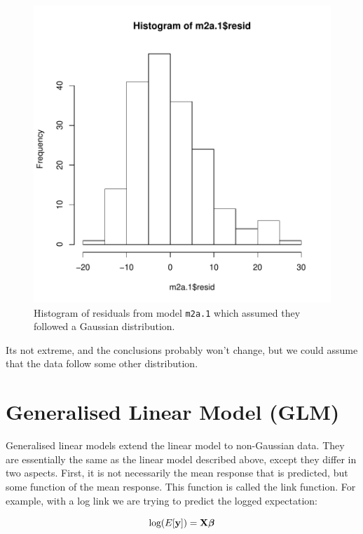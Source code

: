 \documentclass{article}
\begin{document}
\begin{figure}[!h]
\begin{center}
\includegraphics{Lecture2-007}
\end{center}
\caption{Histogram of residuals from model \texttt{m2a.1} which assumed they followed a Gaussian distribution.}
\label{mcmc.traffic-fig}
\end{figure}

Its not extreme, and the conclusions probably won't change, but we could assume that the data follow some other distribution.
 
\section{Generalised Linear Model (GLM)}

Generalised linear models extend the linear model to non-Gaussian data. They are essentially the same as the linear model described above, except they differ in two aspects. First, it is not necessarily the mean response that is predicted, but some function of the mean response. This function is called the link function. For example, with a log link we are trying to predict the logged expectation:

\begin{equation}
\textrm{log}(E[{\bf y}]) = {\bf X}{\bm \beta}
\end{equation}
\end{document}

